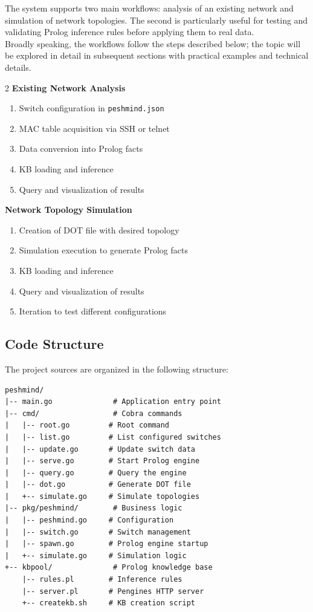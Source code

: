 \documentclass[12pt,a4paper]{article}
\begin{document}
The system supports two main workflows: analysis of an existing network and 
simulation of network topologies. The second is particularly useful for testing and validating Prolog
inference rules before applying them to real data. \\
Broadly speaking, the workflows follow the steps described below; the topic will be explored in detail in subsequent
sections with practical examples and technical details.

\begin{multicols}{2}
        \textbf{Existing Network Analysis}
        \begin{enumerate}
            \item Switch configuration in \texttt{peshmind.json}
            \item MAC table acquisition via SSH or telnet
            \item Data conversion into Prolog facts
            \item KB loading and inference
            \item Query and visualization of results
        \end{enumerate}
\columnbreak
        \textbf{Network Topology Simulation}
        \begin{enumerate}
            \item Creation of DOT file with desired topology
            \item Simulation execution to generate Prolog facts
            \item KB loading and inference
            \item Query and visualization of results
            \item Iteration to test different configurations
        \end{enumerate}
\end{multicols}

\subsection{Code Structure}

The project sources are organized in the following structure:

\begin{verbatim}
peshmind/
|-- main.go              # Application entry point
|-- cmd/                 # Cobra commands
|   |-- root.go         # Root command
|   |-- list.go         # List configured switches
|   |-- update.go       # Update switch data
|   |-- serve.go        # Start Prolog engine
|   |-- query.go        # Query the engine
|   |-- dot.go          # Generate DOT file
|   +-- simulate.go     # Simulate topologies
|-- pkg/peshmind/        # Business logic
|   |-- peshmind.go     # Configuration
|   |-- switch.go       # Switch management
|   |-- spawn.go        # Prolog engine startup
|   +-- simulate.go     # Simulation logic
+-- kbpool/              # Prolog knowledge base
    |-- rules.pl        # Inference rules
    |-- server.pl       # Pengines HTTP server
    +-- createkb.sh     # KB creation script
\end{verbatim}
\end{document}
